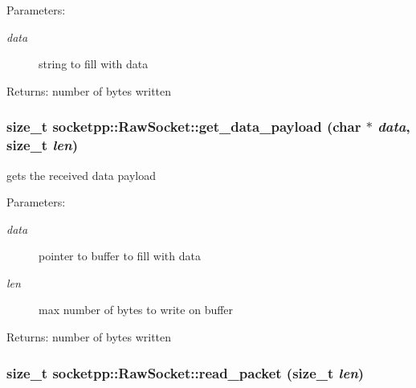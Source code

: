 \begin{Desc}
\item[Parameters:]
\begin{description}
\item[{\em data}]string to fill with data \end{description}
\end{Desc}
\begin{Desc}
\item[Returns:]number of bytes written \end{Desc}
\hypertarget{classsocketpp_1_1RawSocket_bd9631abfa5165ad4ed9e2a31640d1f0}{
\subsubsection[{get\_\-data\_\-payload}]{\setlength{\rightskip}{0pt plus 5cm}size\_\-t socketpp::RawSocket::get\_\-data\_\-payload (char $\ast$ {\em data}, \/  size\_\-t {\em len})}}
\label{classsocketpp_1_1RawSocket_bd9631abfa5165ad4ed9e2a31640d1f0}


gets the received data payload 

\begin{Desc}
\item[Parameters:]
\begin{description}
\item[{\em data}]pointer to buffer to fill with data \item[{\em len}]max number of bytes to write on buffer \end{description}
\end{Desc}
\begin{Desc}
\item[Returns:]number of bytes written \end{Desc}
\hypertarget{classsocketpp_1_1RawSocket_ea48bec4596e2afc89adba2ccb13f6c8}{
\subsubsection[{read\_\-packet}]{\setlength{\rightskip}{0pt plus 5cm}size\_\-t socketpp::RawSocket::read\_\-packet (size\_\-t {\em len})}}
\label{classsocketpp_1_1RawSocket_ea48bec4596e2afc89adba2ccb13f6c8}


